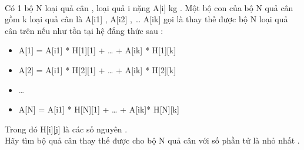  

Có 1 bộ N loại quả cân , loại quả i nặng A[i] kg . Một bộ con của bộ N quả cân gồm k loại quả cân là A[i1] , A[i2] , … A[ik] gọi là thay thế được bộ N loại quả cân trên nếu như tồn tại hệ đẳng thức sau :
\begin{itemize}
	\item A[1] = A[i1] * H[1][1] + … + A[ik] * H[1][k]
	\item A[2] = A[i1] * H[2][1] + … + A[ik] * H[2][k]
	\item …
	\item A[N] = A[i1] * H[N][1] + … + A[ik]* H[N][k]
\end{itemize}

Trong đó H[i][j] là các số nguyên .
\\Hãy tìm bộ quả cân thay thế được cho bộ N quả cân với số phần tử là nhỏ nhất .

\